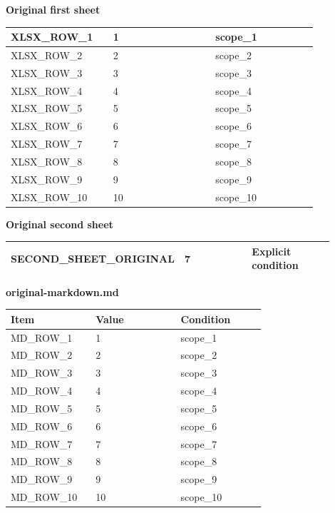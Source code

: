 \documentclass[11pt]{article}
\begin{document}
\par\noindent\begin{minipage}{\linewidth}
\par\noindent\textbf{Original first sheet}
\begingroup\small
\setlength{\tabcolsep}{3pt}
\begin{tabular}{|p{0.30000\linewidth}|p{0.30000\linewidth}|p{0.30000\linewidth}|}
\hline
XLSX\_ROW\_1 & 1 & scope\_1 \\ \hline
XLSX\_ROW\_2 & 2 & scope\_2 \\ \hline
XLSX\_ROW\_3 & 3 & scope\_3 \\ \hline
XLSX\_ROW\_4 & 4 & scope\_4 \\ \hline
XLSX\_ROW\_5 & 5 & scope\_5 \\ \hline
XLSX\_ROW\_6 & 6 & scope\_6 \\ \hline
XLSX\_ROW\_7 & 7 & scope\_7 \\ \hline
XLSX\_ROW\_8 & 8 & scope\_8 \\ \hline
XLSX\_ROW\_9 & 9 & scope\_9 \\ \hline
XLSX\_ROW\_10 & 10 & scope\_10 \\ \hline
\end{tabular}
\endgroup
\end{minipage}\par
\par\noindent\begin{minipage}{\linewidth}
\par\noindent\textbf{Original second sheet}
\begingroup\small
\setlength{\tabcolsep}{3pt}
\begin{tabular}{|p{0.30000\linewidth}|p{0.30000\linewidth}|p{0.30000\linewidth}|}
\hline
SECOND\_SHEET\_ORIGINAL & 7 & Explicit condition \\ \hline
\end{tabular}
\endgroup
\end{minipage}\par
\par\noindent\begin{minipage}{\linewidth}
\par\noindent\textbf{original-markdown.md}
\begingroup\small
\setlength{\tabcolsep}{3pt}
\begin{tabular}{|p{0.30000\linewidth}|p{0.30000\linewidth}|p{0.30000\linewidth}|}
\hline
Item & Value & Condition \\ \hline
MD\_ROW\_1 & 1 & scope\_1 \\ \hline
MD\_ROW\_2 & 2 & scope\_2 \\ \hline
MD\_ROW\_3 & 3 & scope\_3 \\ \hline
MD\_ROW\_4 & 4 & scope\_4 \\ \hline
MD\_ROW\_5 & 5 & scope\_5 \\ \hline
MD\_ROW\_6 & 6 & scope\_6 \\ \hline
MD\_ROW\_7 & 7 & scope\_7 \\ \hline
MD\_ROW\_8 & 8 & scope\_8 \\ \hline
MD\_ROW\_9 & 9 & scope\_9 \\ \hline
MD\_ROW\_10 & 10 & scope\_10 \\ \hline
\end{tabular}
\endgroup
\end{minipage}\par
\end{document}
